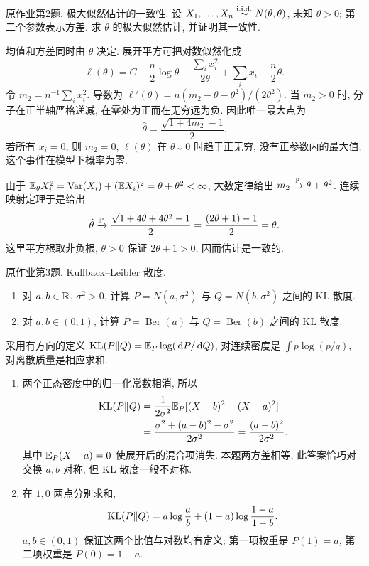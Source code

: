 \begin{exercise}\label{ps03:p02}
原作业第2题. 极大似然估计的一致性. 设 $X_1,\ldots,X_n\stackrel{\mathrm{i.i.d.}}{\sim} N(\theta,\theta)$, 未知 $\theta>0$; 第二个参数表示方差. 求 $\theta$ 的极大似然估计, 并证明其一致性.
\end{exercise}
\begin{solution}
均值和方差同时由 $\theta$ 决定. 展开平方可把对数似然化成
\[
\ell(\theta)=C-\frac n2\log\theta-\frac{\sum_i x_i^2}{2\theta}
+\sum_i x_i-\frac n2\theta.
\]
令 $m_2=n^{-1}\sum_i x_i^2$. 导数为
$\ell'(\theta)=n(m_2-\theta-\theta^2)/(2\theta^2)$.
当 $m_2>0$ 时, 分子在正半轴严格递减, 在零处为正而在无穷远为负. 因此唯一最大点为
\[
\hat\theta=\frac{\sqrt{1+4m_2}-1}{2}.
\]
若所有 $x_i=0$, 则 $m_2=0$, $\ell(\theta)$ 在 $\theta\downarrow0$ 时趋于正无穷, 没有正参数内的最大值; 这个事件在模型下概率为零.

由于 $\mathbb E_\theta X_i^2=\operatorname{Var}(X_i)+(\mathbb E X_i)^2=\theta+\theta^2<\infty$, 大数定律给出 $m_2\xrightarrow{\mathbb P}\theta+\theta^2$. 连续映射定理于是给出
\[
\hat\theta\xrightarrow{\mathbb P}\frac{\sqrt{1+4\theta+4\theta^2}-1}{2}
=\frac{(2\theta+1)-1}{2}=\theta.
\]
这里平方根取非负根, $\theta>0$ 保证 $2\theta+1>0$, 因而估计是一致的.
\end{solution}

\begin{exercise}\label{ps03:p03}
原作业第3题. Kullback--Leibler 散度.
\begin{enumerate}[label=\arabic*.]
\item 对 $a,b\in\mathbb R$, $\sigma^2>0$, 计算 $P=N(a,\sigma^2)$ 与 $Q=N(b,\sigma^2)$ 之间的 KL 散度.
\item 对 $a,b\in(0,1)$, 计算 $P=\operatorname{Ber}(a)$ 与 $Q=\operatorname{Ber}(b)$ 之间的 KL 散度.
\end{enumerate}
\end{exercise}
\begin{solution}
采用有方向的定义 $\operatorname{KL}(P\Vert Q)=\mathbb E_P\log(\,\mathrm d P/\,\mathrm d Q)$, 对连续密度是 $\int p\log(p/q)$, 对离散质量是相应求和.
\begin{enumerate}[label=\arabic*.]
\item 两个正态密度中的归一化常数相消, 所以
\begin{align*}
\operatorname{KL}(P\Vert Q)
&=\frac1{2\sigma^2}\mathbb E_P[(X-b)^2-(X-a)^2]\\
&=\frac{\sigma^2+(a-b)^2-\sigma^2}{2\sigma^2}
=\frac{(a-b)^2}{2\sigma^2}.
\end{align*}
其中 $\mathbb E_P(X-a)=0$ 使展开后的混合项消失. 本题两方差相等, 此答案恰巧对交换 $a,b$ 对称, 但 KL 散度一般不对称.
\item 在 $1,0$ 两点分别求和,
\[
\operatorname{KL}(P\Vert Q)=a\log\frac ab+(1-a)\log\frac{1-a}{1-b}.
\]
$a,b\in(0,1)$ 保证这两个比值与对数均有定义; 第一项权重是 $P(1)=a$, 第二项权重是 $P(0)=1-a$.
\end{enumerate}
\end{solution}

